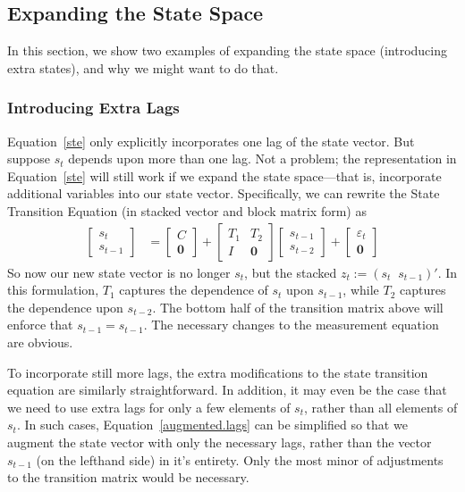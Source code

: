 \documentclass[a4paper,12pt]{article}
\begin{document}
\newpage
\subsection{Expanding the State Space}

In this section, we show two examples of expanding the state space
(introducing extra states), and why we might want to do that. 

\subsubsection{Introducing Extra Lags}

Equation~\ref{ste} only explicitly incorporates one lag of the state
vector. But suppose $s_t$ depends upon more than one lag. Not a problem;
the representation in Equation~\ref{ste} will still work if we expand
the state space---that is, incorporate additional variables into our
state vector. Specifically, we can rewrite the State Transition Equation
(in stacked vector and block matrix form) as 
\begin{align}
  \begin{bmatrix} s_{t} \\ s_{t-1}
  \end{bmatrix}
     &= 
  \begin{bmatrix} C \\ \mathbf{0} 
  \end{bmatrix}
  +\begin{bmatrix} T_1 & T_2 \\ I & \mathbf{0}
  \end{bmatrix}
  \begin{bmatrix} s_{t-1} \\ s_{t-2}
  \end{bmatrix}
  + \begin{bmatrix} 
      \varepsilon_{t}  \\ \mathbf{0}
    \end{bmatrix}
  \label{augmented.lags} 
\end{align}
So now our new state vector is no longer $s_t$, but the stacked $z_t:=(s_t \;\; s_{t-1})'$. In this formulation, $T_1$ captures the dependence of $s_t$ upon $s_{t-1}$, while $T_2$ captures the dependence upon $s_{t-2}$. The bottom half of the transition matrix above will enforce that $s_{t-1}=s_{t-1}$. The necessary changes to the measurement equation are obvious.

To incorporate still more lags, the extra modifications to the state
transition equation are similarly straightforward. In addition, it may
even be the case that we need to use extra lags for only a few elements
of $s_t$, rather than all elements of $s_t$. In such cases,
Equation~\ref{augmented.lags} can be simplified so that we augment the
state vector with only the necessary lags, rather than the vector
$s_{t-1}$ (on the lefthand side) in it's entirety. Only the most minor
of adjustments to the transition matrix would be necessary.
\end{document}
